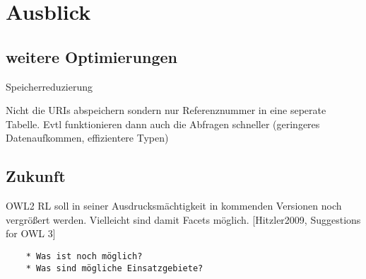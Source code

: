 \chapter{Ausblick}


\section{weitere Optimierungen}
Speicherreduzierung

Nicht die URIs abspeichern sondern nur Referenznummer in eine seperate Tabelle. Evtl funktionieren dann auch die Abfragen schneller (geringeres Datenaufkommen, effizientere Typen)

\section{Zukunft}
OWL2 RL soll in seiner Ausdrucksmächtigkeit in kommenden Versionen noch vergrößert werden. Vielleicht sind damit Facets möglich. [Hitzler2009, Suggestions for OWL 3]


\begin{verbatim}
    * Was ist noch möglich?
    * Was sind mögliche Einsatzgebiete? 
\end{verbatim}
